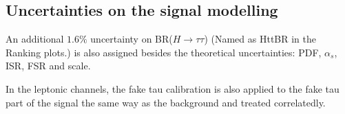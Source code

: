 
\subsection{Uncertainties on the signal modelling}

An additional $1.6\%$ uncertainty on BR($H\to\tau\tau$) (Named as HttBR in the Ranking plots.) is also assigned \cite{HiggsBR} besides the theoretical uncertainties: PDF, $\alpha_s$, ISR, FSR and scale.

In the leptonic channels, the fake tau calibration is also applied to the fake tau part of the signal the same way as the background and treated correlatedly.
